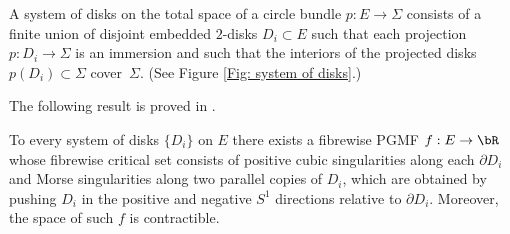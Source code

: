 \begin{definition}
A system of disks on the total space of a circle bundle \hbox{$p:E\!\to\!\Sigma$} consists of a finite union of disjoint embedded $2$-disks $D_i \subset E$ such that each projection \hbox{$p:D_i \to \Sigma$} is an immersion and such that the interiors of the projected disks \hbox{$p(D_i) \subset \Sigma$} cover~$\Sigma$. (See Figure \ref{Fig: system of disks}.)
\end{definition}

The following result is proved in \cite{IK93}.

\begin{proposition}\label{systems}
To every system of disks $\{ D_i \}$ on $E$ there exists a fibrewise PGMF $f:E \to \bR$ whose fibrewise critical set consists of positive cubic singularities along each $\partial D_i$ and Morse singularities along two parallel copies of $D_i$, which are obtained by pushing $D_i$ in the positive and negative $S^1$ directions relative to $\partial D_i$. Moreover, the space of such $f$ is contractible.
\end{proposition}

